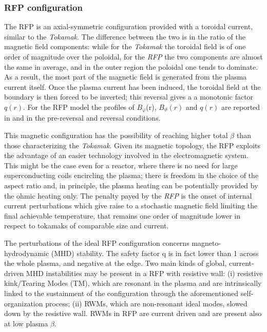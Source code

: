 \subsubsection{RFP configuration}
The \ac{RFP} is an axial-symmetric configuration provided with a toroidal current, similar to the \textit{Tokamak}. The difference between the two is in the ratio of the magnetic field components: while for the \textit{Tokamak} the toroidal field is of one order of magnitude over the poloidal, for the \textit{RFP} the two components are almost the same in average, and in the outer region the poloidal one tends to dominate. As a result, the most part of the magnetic field is generated from the plasma current itself.
Once the plasma current has been induced, the toroidal field at the boundary is then forced to be inverted; this reversal gives a  a monotonic factor $q(r)$. For the \acs{RFP} model the profiles of $B_\varphi$(r), $B_\vartheta(r)$ and $q(r)$ are reported in \Figure{\ref{fig:intro_safety_factor_profiles_b}} and \Figure{\ref{fig:intro_safety_factor_profiles_c}} in the pre-reversal and reversal conditions.

This magnetic configuration has the possibility of reaching higher total $\beta$ than those characterizing the \textit{Tokamak}. 
Given its magnetic topology, the RFP exploits the advantage of an easier technology involved in the electromagnetic system. This might be the case even for a reactor, where there is no need for large superconducting coils encircling the plasma; there is freedom in the choice of the aspect ratio and, in principle, the plasma heating can be potentially provided by the ohmic heating only.  
The penalty payed by the \textit{RFP} is the onset of internal current perturbations  which give raise to a stochastic magnetic field limiting the final achievable temperature, that remains one order of magnitude lower in respect to tokamaks of comparable size and current.

The perturbations of the ideal RFP configuration concerns magneto-hydrodynamic (MHD) stability. The safety factor q is in fact lower than 1 across the whole plasma, and negative at the edge. 
Two main kinds of global, current-driven MHD instabilities may be present in a RFP with resistive wall: (i) resistive kink/Tearing Modes (TM), which are resonant in the plasma and are intrinsically linked to the sustainment of the configuration through the aforementioned self-organization process; (ii) RWMs, which are non-resonant ideal modes, slowed down by the resistive wall. RWMs in RFP are current driven and are present also at low plasma $\beta$.


